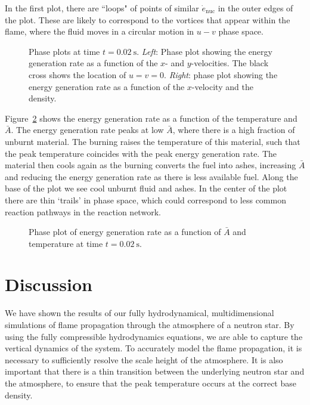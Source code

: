 \documentclass[trackchanges,preprint,times,tighten]{aastex63}
\begin{document}
In the first plot, there are ``loops" of
points of similar $\dot{e}_\mathrm{nuc}$ in the outer edges of the plot.
These are likely to correspond to the vortices that appear within the flame,
where the fluid moves in a circular motion in $u-v$ phase space.

\begin{figure}[t]
\centering
{}
\caption{\label{fig:phase_plots} Phase plots at time $t = 0.02~\mathrm{s}$.
\emph{Left}: Phase plot showing the energy generation rate as a function of
the $x$- and $y$-velocities. The black cross shows the location of $u = v = 0$. \emph{Right}: phase plot showing the energy
generation rate as a function of the $x$-velocity and the density.}
\end{figure}

Figure~\ref{fig:abar_temp} shows the energy generation rate as a function of the
temperature and $\bar{A}$. 
The energy generation rate peaks at low $\bar{A}$, where there is a high fraction
of unburnt material. The burning raises the temperature of this material, such
that the peak temperature coincides with the peak energy generation rate. The
material then cools again as the burning converts the fuel into ashes,
increasing $\bar{A}$ and reducing the energy generation rate as there is
less available fuel. Along the base of the plot we see cool unburnt fluid and
ashes. In the center of the plot there are thin `trails' in phase space, which
could correspond to less common reaction pathways in the reaction network.

\begin{figure}[t]
\centering
{}
\caption{\label{fig:abar_temp} Phase plot of energy generation rate as a function of $\bar{A}$ and temperature at time $t = 0.02~\mathrm{s}$.}
\end{figure}


\section{Discussion}

We have shown the results of our fully hydrodynamical,
multidimensional simulations of flame propagation through the
atmosphere of a neutron star. By using the fully compressible
hydrodynamics equations, we are able to capture the vertical dynamics
of the system. To accurately model the flame propagation, it is
necessary to sufficiently resolve the scale height of the
atmosphere. It is also important that there is a thin transition
between the underlying neutron star and the atmosphere, to ensure that
the peak temperature occurs at the correct base density.
\end{document}
